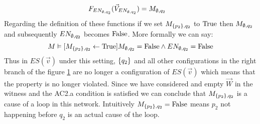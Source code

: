 \begin{example}
\begin{align*}
        F_{EN_{\emptyset,q_2}}(\vec V_{EN_{\emptyset,q_2}}) & = M_{\emptyset,q_2}
    \end{align*}
    Regarding the definition of these functions if we set $M_{\{p_2\},q_2}$
    to $\mathrm{True}$ then $M_{\emptyset,q_2}$ and subsequently $EN_{\emptyset,q_2}$ becomes $\mathrm{False}$.
    More formally we can say:
    \begin{equation*}
        M \vDash [M_{\{p_2\},q_2} \leftarrow \mathrm{True}] M_{\emptyset,q_2} = \mathrm{False} \wedge
        EN_{\emptyset,q_2} = \mathrm{False}
    \end{equation*}
    Thus in $ES(\vec v)$ under this setting, $\{q_2\}$ and all other 
    configurations in the right branch of the 
    figure \ref{fig:loop:es} are no longer a configuration of 
    $ES(\vec v)$ which means that the property is no longer violated.
    Since we have considered and empty $\vec W$ in the witness and
    the AC2.a condition is satisfied we can conclude that 
    $M_{\{p_2\},q_2}$ is a cause of a loop in this network.
    Intuitively $M_{\{p_2\},q_2} = \mathrm{False}$ means $p_2$ not happening
    before $q_2$ is an actual cause of the loop.
    \begin{figure}
        \centering
        \caption{}
        \label{fig:loop:es}
    \end{figure}

\end{example}